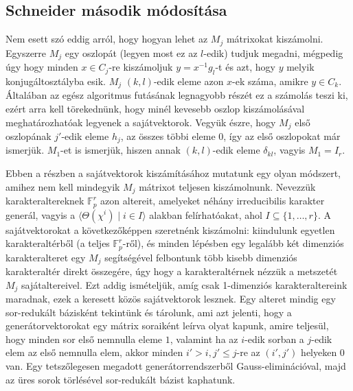 \subsection{Schneider második módosítása}
\label{subsec:bdssch2}
Nem esett szó eddig arról, hogy hogyan lehet az $M_j$ mátrixokat kiszámolni.
Egyszerre $M_j$ egy oszlopát (legyen most ez az $l$-edik) tudjuk megadni, mégpedig úgy hogy minden $x \in C_j$-re kiszámoljuk
$y=x^{-1}g_l$-t és azt, hogy $y$ melyik konjugáltosztályba esik.
$M_j$ $(k,l)$-edik eleme azon $x$-ek száma, amikre $y\in C_k$.
Általában az egész algoritmus futásának legnagyobb részét ez a számolás teszi ki, ezért arra kell törekednünk, hogy minél kevesebb oszlop kiszámolásával meghatározhatóak legyenek a sajátvektorok.
Vegyük észre, hogy $M_j$ első oszlopának $j'$-edik eleme $h_j$, az összes többi eleme $0$, így az első oszlopokat már ismerjük.
$M_1$-et is ismerjük, hiszen annak $(k,l)$-edik eleme $\delta_{kl}$, vagyis $M_1=I_r$.

Ebben a részben a sajátvektorok kiszámításához mutatunk egy olyan módszert, amihez nem kell mindegyik $M_j$ mátrixot teljesen kiszámolnunk.
Nevezzük karakteraltereknek $\mathbb{F}_p^r$ azon altereit, amelyeket néhány irreducibilis karakter generál, vagyis a $\langle \Theta(\chi^i) \mid i \in I \rangle$ alakban felírhatóakat, ahol $I \subseteq \{1,\dots,r\}$.
A sajátvektorokat a következőképpen szeretnénk kiszámolni:
kiindulunk egyetlen karakteraltérből (a teljes $\mathbb{F}_p^r$-ről), és minden lépésben egy legalább két dimenziós karakteralteret egy $M_j$ segítségével felbontunk több kisebb dimenziós karakteraltér direkt összegére,
úgy hogy a karakteraltérnek nézzük a metszetét $M_j$ sajátaltereivel.
Ezt addig ismételjük, amíg csak 1-dimenziós karakteraltereink maradnak, ezek a keresett közös sajátvektorok lesznek.
Egy alteret mindig egy sor-redukált bázisként tekintünk és tárolunk, ami azt jelenti, hogy a generátorvektorokat egy mátrix soraiként leírva olyat kapunk,
amire teljesül, hogy minden sor első nemnulla eleme $1$, valamint ha az $i$-edik sorban a $j$-edik elem az első nemnulla elem, akkor minden $i' > i, j'\le j$-re az $(i',j')$ helyeken 0 van.
Egy tetszőlegesen megadott generátorrendszerből Gauss-eliminációval, majd az üres sorok törlésével sor-redukált bázist kaphatunk.

